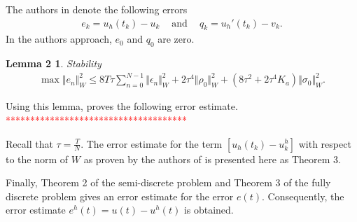 \documentclass[../../main.tex]{subfiles}
\begin{document}
The authors in \cite{BV13} denote the following errors
\begin{eqnarray*}
	e_{k}=u_{h}(t_{k})-u_{k} \ \ \ \ \textrm{ and } \ \ \ \ q_{k}=u_{h}'(t_{k})-v_{k}.
\end{eqnarray*} In the authors approach, $e_0$ and $q_0$ are zero.

\newtheorem*{DC_Lem3}{Lemma 2}
\begin{DC_Lem3}
	Stability
	\begin{eqnarray*}
		\max\Vert e_{n}\Vert_{W}^{2}\leq 8T\tau\sum_{n=0}^{N-1}\Vert\epsilon_{n}\Vert_{W}^{2}+2\tau^{4}\Vert\rho_{0}\Vert_{W}^{2}+(8\tau^{2}+2\tau^{4}K_{a})\Vert\sigma_{0}\Vert_{W}^{2}.
	\end{eqnarray*}
\end{DC_Lem3}

Using this lemma, \cite{BV13} proves the following error estimate.\\
\textcolor{red}{*************************************}

Recall that $\displaystyle \tau = \frac{T}{N}$. The error estimate for the term $[u_h(t_k) - u^h_k]$ with respect to the norm of $W$ as proven by the authors of \cite{BV13} is presented here as Theorem 3.



Finally, Theorem 2 of the semi-discrete problem and Theorem 3 of the fully discrete problem gives an error estimate for the error $e(t)$. Consequently, the error estimate $e^h(t) = u(t) - u^h(t)$ is obtained.
		
		
\end{document}
